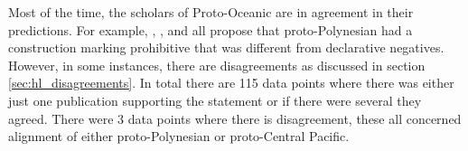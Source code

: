 \documentclass[12pt,letterpaper]{article}
\begin{document}
Most of the time, the scholars of Proto-Oceanic are in agreement in their predictions. For example, \citet[142]{pawley1973some}, \citet[292]{ross2007two}, \citet[xiii, 125]{clark1973aspects} and \citet[89]{lynchrosscrowley_proto_grammar_oceanic} all propose that proto-Polynesian had a construction marking prohibitive that was different from declarative negatives. However, in some instances, there are disagreements as discussed in section \ref{sec:hl_disagreements}. In total there are 115 data points where there was either just one publication supporting the statement or if there were several they agreed. There were 3 data points where there is disagreement, these all concerned alignment of either proto-Polynesian or proto-Central Pacific.



\end{document}

